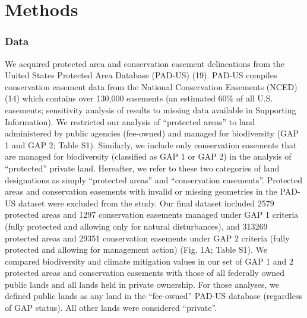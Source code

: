\documentclass[3p]{elsarticle} %
\begin{document}
\hypertarget{methods}{%
\section{Methods}\label{methods}}

\hypertarget{data}{%
\subsubsection{Data}\label{data}}

We acquired protected area and conservation easement delineations from
the United States Protected Area Database (PAD-US) (19). PAD-US compiles
conservation easement data from the National Conservation Easements
(NCED) (14) which contains over 130,000 easements (an estimated 60\% of
all U.S. easements; sensitivity analysis of results to missing data
available in Supporting Information). We restricted our analysis of
``protected areas'' to land administered by public agencies (fee-owned)
and managed for biodiversity (GAP 1 and GAP 2; Table S1). Similarly, we
include only conservation easements that are managed for biodiversity
(classified as GAP 1 or GAP 2) in the analysis of ``protected'' private
land. Hereafter, we refer to these two categories of land designations
as simply ``protected areas'' and ``conservation easements''. Protected
areas and conservation easements with invalid or missing geometries in
the PAD-US dataset were excluded from the study. Our final dataset
included 2579 protected areas and 1297 conservation easements managed
under GAP 1 criteria (fully protected and allowing only for natural
disturbances), and 313269 protected areas and 29351 conservation
easements under GAP 2 criteria (fully protected and allowing for
management action) (Fig. 1A; Table S1). We compared biodiversity and
climate mitigation values in our set of GAP 1 and 2 protected areas and
conservation easements with those of all federally owned public lands
and all lands held in private ownership. For those analyses, we defined
public lands as any land in the ``fee-owned'' PAD-US database
(regardless of GAP status). All other lands were considered ``private''.
\end{document}
